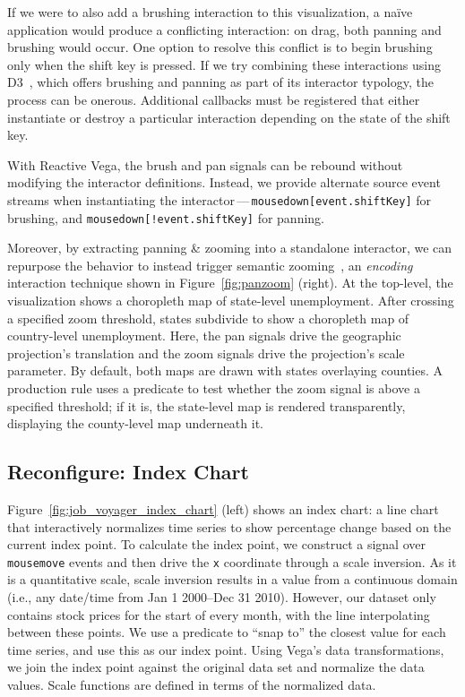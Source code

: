 If we were to also add a brushing interaction to this visualization, a na\"ive
application would produce a conflicting interaction: on drag, both panning and
brushing would occur. One option to resolve this conflict is to begin brushing
only when the shift key is pressed. If we try combining these interactions using
D3~\cite{bostock:d3}, which offers brushing and panning as part of its
interactor typology, the process can be onerous. Additional callbacks must be
registered that either instantiate or destroy a particular interaction depending
on the state of the shift key.

With Reactive Vega, the brush and pan signals can be rebound without modifying
the interactor definitions. Instead, we provide alternate source event streams
when instantiating the interactor\,---\,\texttt{mousedown[event.shiftKey]} for
brushing, and \texttt{mousedown[!event.shiftKey]} for panning.

Moreover, by extracting panning \& zooming into a standalone interactor, we can
repurpose the behavior to instead trigger semantic zooming~\cite{perlin:pad}, an
\emph{encoding} interaction technique shown in Figure~\ref{fig:panzoom} (right).
At the top-level, the visualization shows a choropleth map of state-level
unemployment. After crossing a specified zoom threshold, states subdivide to
show a choropleth map of country-level unemployment. Here, the pan signals drive
the geographic projection's translation and the zoom signals drive the
projection's scale parameter. By default, both maps are drawn with states
overlaying counties. A production rule uses a predicate to test whether the zoom
signal is above a specified threshold; if it is, the state-level map is rendered
transparently, displaying the county-level map underneath it.

\subsection{Reconfigure: Index Chart}

Figure~\ref{fig:job_voyager_index_chart} (left) shows an index chart: a line
chart that interactively normalizes time series to show percentage change based
on the current index point. To calculate the index point, we construct a signal
over \texttt{mousemove} events and then drive the \texttt{x} coordinate through
a scale inversion. As it is a quantitative scale, scale inversion results in a
value from a continuous domain (i.e., any date/time from Jan 1 2000--Dec 31
2010). However, our dataset only contains stock prices for the start of every
month, with the line interpolating between these points. We use a predicate to
``snap to'' the closest value for each time series, and use this as our index
point. Using Vega's data transformations, we join the index point against the
original data set and normalize the data values. Scale functions are defined in
terms of the normalized data.

